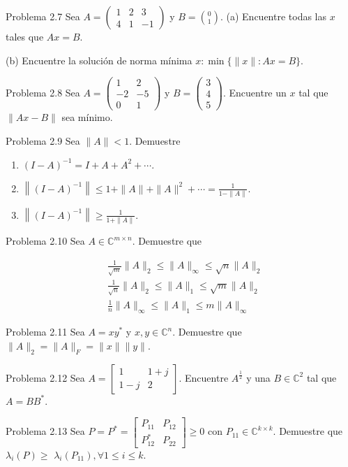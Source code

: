 \documentclass[11pt]{article}
\begin{document}
Problema 2.7 Sea $A=\left(\begin{array}{ccc}1 & 2 & 3 \\ 4 & 1 & -1\end{array}\right)$ y $B=\binom{0}{1}$. (a) Encuentre todas las $x$ tales que $A x=B$.

(b) Encuentre la solución de norma mínima $x: \min \{\|x\|: A x=B\}$.

Problema 2.8 Sea $A=\left(\begin{array}{cc}1 & 2 \\ -2 & -5 \\ 0 & 1\end{array}\right)$ y $B=\left(\begin{array}{l}3 \\ 4 \\ 5\end{array}\right)$. Encuentre un $x$ tal que $\|A x-B\|$ sea mínimo.

Problema 2.9 Sea $\|A\|<1$. Demuestre

\begin{enumerate}
  \item $(I-A)^{-1}=I+A+A^{2}+\cdots$.
  \item $\left\|(I-A)^{-1}\right\| \leq 1+\|A\|+\|A\|^{2}+\cdots=\frac{1}{1-\|A\|}$.
  \item $\left\|(I-A)^{-1}\right\| \geq \frac{1}{1+\|A\|}$.
\end{enumerate}

Problema 2.10 Sea $A \in \mathbb{C}^{m \times n}$. Demuestre que

$$
\begin{aligned}
& \frac{1}{\sqrt{m}}\|A\|_{2} \leq\|A\|_{\infty} \leq \sqrt{n}\|A\|_{2} \\
& \frac{1}{\sqrt{n}}\|A\|_{2} \leq\|A\|_{1} \leq \sqrt{m}\|A\|_{2} \\
& \frac{1}{n}\|A\|_{\infty} \leq\|A\|_{1} \leq m\|A\|_{\infty}
\end{aligned}
$$

Problema 2.11 Sea $A=x y^{*}$ y $x, y \in \mathbb{C}^{n}$. Demuestre que $\|A\|_{2}=\|A\|_{F}=\|x\|\|y\|$.

Problema 2.12 Sea $A=\left[\begin{array}{cc}1 & 1+j \\ 1-j & 2\end{array}\right]$. Encuentre $A^{\frac{1}{2}}$ y una $B \in \mathbb{C}^{2}$ tal que $A=B B^{*}$.

Problema 2.13 Sea $P=P^{*}=\left[\begin{array}{ll}P_{11} & P_{12} \\ P_{12}^{*} & P_{22}\end{array}\right] \geq 0$ con $P_{11} \in \mathbb{C}^{k \times k}$. Demuestre que $\lambda_{i}(P) \geq$ $\lambda_{i}\left(P_{11}\right), \forall 1 \leq i \leq k$.
\end{document}
